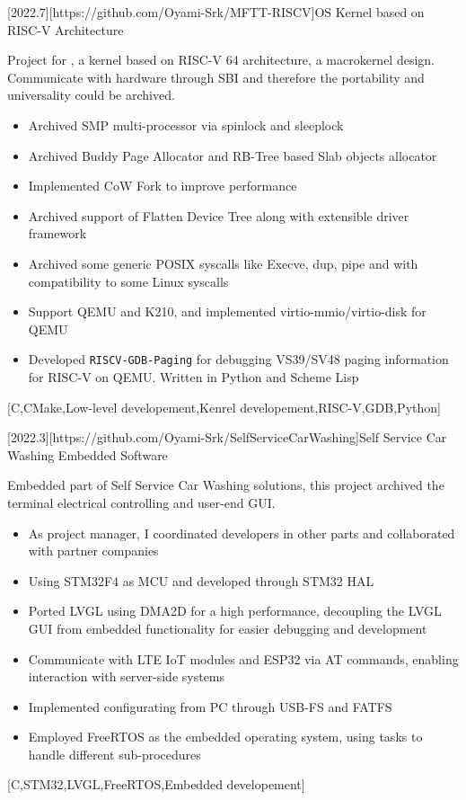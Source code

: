 \documentclass{resume}
\begin{document}
\begin {projects}
	[2022.7][https://github.com/Oyami-Srk/MFTT-RISCV]{OS Kernel based on RISC-V Architecture}{
		Project for , a kernel based on RISC-V 64 architecture, a macrokernel design. Communicate with hardware through SBI and therefore the portability and universality could be archived.
		\begin{itemize}
			\item Archived SMP multi-processor via spinlock and sleeplock
			\item Archived Buddy Page Allocator and RB-Tree based Slab objects allocator
			\item Implemented CoW Fork to improve performance
			\item Archived support of Flatten Device Tree along with extensible driver framework
			\item Archived some generic POSIX syscalls like Execve, dup, pipe and with compatibility to some Linux syscalls
			\item Support QEMU and K210, and implemented virtio-mmio/virtio-disk for QEMU
			\item Developed  {\texttt{RISCV-GDB-Paging}} for debugging VS39/SV48 paging information for RISC-V on QEMU. Written in Python and Scheme Lisp
		\end{itemize}
	}[C,CMake,Low-level developement,Kenrel developement,RISC-V,GDB,Python]

	[2022.3][https://github.com/Oyami-Srk/SelfServiceCarWashing]{Self Service Car Washing Embedded Software}{
		Embedded part of Self Service Car Washing solutions, this project archived the terminal electrical controlling and user-end GUI.
		\begin{itemize}
			\item As project manager, I coordinated developers in other parts and collaborated with partner companies
			\item Using STM32F4 as MCU and developed through STM32 HAL
			\item Ported LVGL using DMA2D for a high performance, decoupling the LVGL GUI from embedded functionality for easier debugging and development
			\item Communicate with LTE IoT modules and ESP32 via AT commands, enabling interaction with server-side systems
			\item Implemented configurating from PC through USB-FS and FATFS
			\item Employed FreeRTOS as the embedded operating system, using tasks to handle different sub-procedures
		\end{itemize}
	}[C,STM32,LVGL,FreeRTOS,Embedded developement]
\end {projects}
\end{document}

